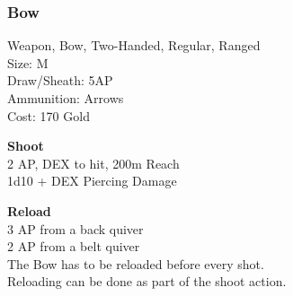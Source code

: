 \subsubsection{Bow}\label{weapon:bow}
Weapon, Bow, Two-Handed, Regular, Ranged\\
Size: M\\
Draw/Sheath: 5AP\\
Ammunition: Arrows\\
Cost: 170 Gold

\textbf{Shoot}\\
2 AP, DEX to hit, 200m Reach\\
1d10 + \texttimes DEX Piercing Damage

\textbf{Reload}\\
3 AP from a back quiver\\
2 AP from a belt quiver\\
The Bow has to be reloaded before every shot.\\
Reloading can be done as part of the shoot action.